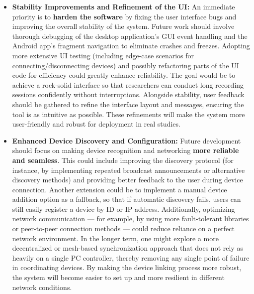 \begin{itemize}
\item \textbf{Stability Improvements and Refinement of the UI:} An immediate
  priority is to \textbf{harden the software} by fixing the user interface
  bugs and improving the overall stability of the system. Future work
  should involve thorough debugging of the desktop application's GUI
  event handling and the Android app's fragment navigation to eliminate
  crashes and freezes. Adopting more extensive UI testing (including
  edge-case scenarios for connecting/disconnecting devices) and possibly
  refactoring parts of the UI code for efficiency could greatly enhance
  reliability. The goal would be to achieve a rock-solid interface so
  that researchers can conduct long recording sessions confidently
  without interruptions. Alongside stability, user feedback should be
  gathered to refine the interface layout and messages, ensuring the
  tool is as intuitive as possible. These refinements will make the
  system more user-friendly and robust for deployment in real studies.

\item \textbf{Enhanced Device Discovery and Configuration:} Future development
  should focus on making device recognition and networking \textbf{more
  reliable and seamless}. This could include improving the discovery
  protocol (for instance, by implementing repeated broadcast
  announcements or alternative discovery methods) and providing better
  feedback to the user during device connection. Another extension could
  be to implement a manual device addition option as a fallback, so that
  if automatic discovery fails, users can still easily register a device
  by ID or IP address. Additionally, optimizing network communication ---
  for example, by using more fault-tolerant libraries or peer-to-peer
  connection methods --- could reduce reliance on a perfect network
  environment. In the longer term, one might explore a more
  decentralized or mesh-based synchronization approach that does not
  rely as heavily on a single PC controller, thereby removing any single
  point of failure in coordinating devices. By making the device linking
  process more robust, the system will become easier to set up and more
  resilient in different network conditions.


\end{itemize}
